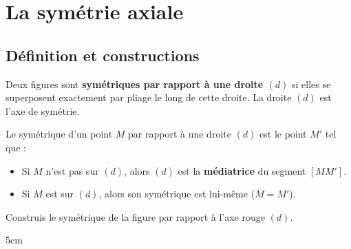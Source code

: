 \documentclass[a4paper]{book}
\begin{document}
\setcounter{chapter}{12} 
\renewcommand{\monTitre}{La symétrie axiale}
\chapter{\monTitre}
\thispagestyle{fancy}


\section{Définition et constructions}

    \begin{definition}
        Deux figures sont \textbf{symétriques par rapport à une droite $(d)$} si elles se superposent exactement par pliage le long de cette droite. La droite $(d)$ est l'axe de symétrie.
    \end{definition}
    
    
    \begin{definition}
        Le symétrique d'un point $M$ par rapport à une droite $(d)$ est le point $M'$ tel que :
        \begin{itemize}
            \item Si $M$ n'est pas sur $(d)$, alors $(d)$ est la \textbf{médiatrice} du segment $[MM']$.
            \item Si $M$ est sur $(d)$, alors son symétrique est lui-même ($M = M'$).
        \end{itemize}
    \end{definition}
    
    
    \begin{center}
    \end{center}
    
    
    \begin{exemple}
        Construis le symétrique de la figure par rapport à l'axe rouge $(d)$.
        \begin{ZoneReponse}{5cm}
        \begin{center}
        \end{center}
        \end{ZoneReponse}
    \end{exemple}
    
\end{document}
